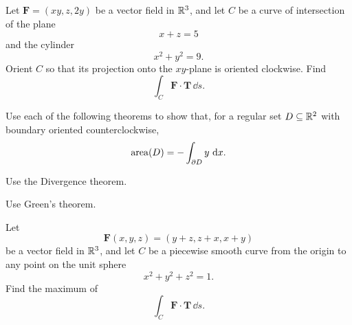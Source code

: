 \begin{problem}
Let $\mathbf F=(xy,z,2y)$ be a vector field in $\mathbb{R}^3$, and let $C$ be a curve of intersection of the plane
\[
x+z=5
\]
and the cylinder
\[
x^2+y^2=9.
\]
Orient $C$ so that its projection onto the $xy$-plane is oriented clockwise. Find
\[
\int_C\mathbf F\cdot\mathbf T\,\dd s.
\]
\end{problem}

\begin{problem}
Use each of the following theorems to show that, for a regular set $D\subseteq\mathbb{R}^2$ with boundary oriented counterclockwise,
\[
\operatorname{area}(D)=-\int_{\partial D}y\,\mathop{}\!\mathrm{d} x.
\]
\begin{problemsubparts}
\item Use the Divergence theorem.
\item Use Green's theorem.
\end{problemsubparts}
\end{problem}

\begin{problem}
Let
\[
\mathbf F(x,y,z)=(y+z,z+x,x+y)
\]
be a vector field in $\mathbb{R}^3$, and let $C$ be a piecewise smooth curve from the origin to any point on the unit sphere
\[
x^2+y^2+z^2=1.
\]
Find the maximum of
\[
\int_C\mathbf F\cdot\mathbf T\,\dd s.
\]
\end{problem}

